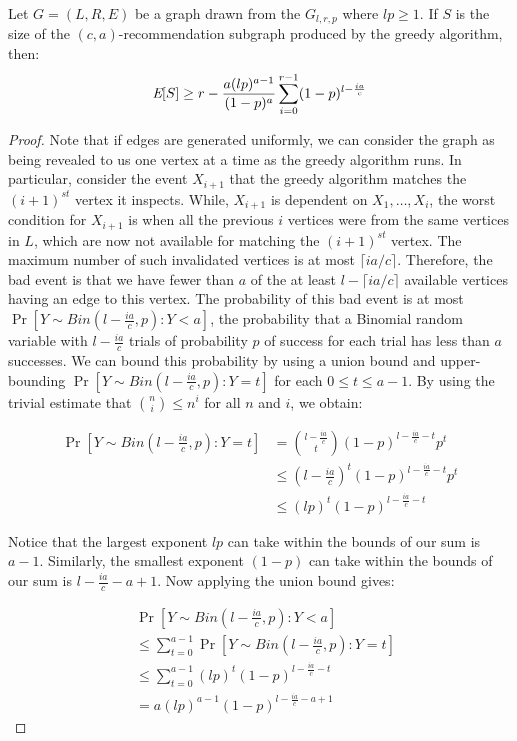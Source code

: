 \begin{thm}\label{greed-is-good}
Let $G=(L,R,E)$ be a graph drawn from the $G_{l,r,p}$ where $lp \geq 1$. If $S$ is the size of the $(c,a)$-recommendation subgraph produced by the greedy algorithm, then:
\[ \emph{\text{E}}[S] \geq r - \frac{a(lp)^{a-1}}{(1-p)^a} \sum_{i=0}^{r-1}(1-p)^{l-\frac{ia}{c}}\]
\end{thm}
\begin{proof}
Note that if edges are generated uniformly, we can consider the
graph as being revealed to us one vertex at a time as the greedy
algorithm runs. In particular, consider the event $X_{i+1}$ that the
greedy algorithm matches the $(i+1)^{st}$ vertex it inspects. While,
$X_{i+1}$ is dependent on $X_1,\ldots, X_i$, the worst condition for
$X_{i+1}$ is when all the previous $i$ vertices were from the same
vertices in $L$, which are now not available for matching the
$(i+1)^{st}$ vertex. The maximum number of such invalidated vertices
is at most $\lceil ia/c \rceil$. Therefore, the bad event
is that we have fewer than $a$ of the at least $l-\lceil ia/c \rceil$ 
available vertices having an edge to this vertex. The probability of this
bad event is at most $\Pr[Y\sim Bin(l-\frac{ia}{c},p): Y < a]$, the
probability that a Binomial random variable with $l - \frac{ia}{c}$
trials of probability $p$ of success for each trial has less than $a$
successes. We can bound this probability by using a union bound and
upper-bounding $\Pr[Y\sim Bin(l-\frac{ia}{c},p): Y = t]$ for each 
$0 \leq t \leq a-1$. By using the trivial estimate that
$\binom{n}{i} \leq n^i$ for all $n$ and $i$, we obtain:

\begin{align*}
      \Pr[Y\sim Bin(l-\frac{ia}{c},p): Y = t]
&=    \binom{l-\frac{ia}{c}}{t} (1-p)^{l-\frac{ia}{c}-t}p^{t} \\
&\leq \left(l-\frac{ia}{c}\right)^t (1-p)^{l-\frac{ia}{c}-t} p^{t} \\
&\leq (lp)^t (1-p)^{l-\frac{ia}{c}-t} 
\end{align*}

Notice that the largest exponent $lp$ can take within the bounds of
our sum is $a-1$. Similarly, the smallest exponent $(1-p)$ can take
within the bounds of our sum is $l-\frac{ia}{c}-a+1$. Now applying
the union bound gives:

\begin{align*}
&           \Pr[Y\sim Bin(l-\frac{ia}{c},p): Y < a] \\
&\leq  \sum_{t=0}^{a-1} \Pr[Y\sim Bin(l-\frac{ia}{c},p): Y = t] \\
&\leq  \sum_{t=0}^{a-1} (lp)^t (1-p)^{l-\frac{ia}{c}-t} \\
&=     a(lp)^{a-1} (1-p)^{l-\frac{ia}{c}-a+1}
\end{align*}


\end{proof}

